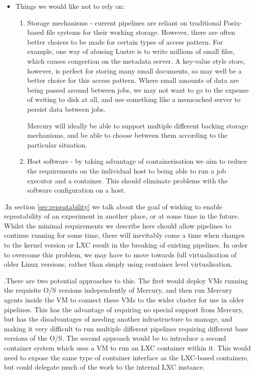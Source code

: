 \documentclass[10pt,a4paper]{article}
\newcounter{paracounter}
\newcommand{\npar}{\par\noindent\refstepcounter{paracounter}\theparacounter.\space}
\begin{document}
\begin{itemize}
\begin{enumerate}
\end{enumerate}
\item Things we would like not to rely on:
\begin{enumerate}
\item Storage mechanisms - current pipelines are reliant on traditional Posix-based file systems for their working storage. However, there are often better choices to be made for certain types of access pattern. For example, one way of abusing Lustre is to write millions of small files, which causes congestion on the metadata server. A key-value style store, however, is perfect for storing many small documents, so may well be a better choice for this access pattern. Where small amounts of data are being passed around between jobs, we may not want to go to the expense of writing to disk at all, and use something like a memcached server to persist data between jobs.

Mercury will ideally be able to support multiple different backing storage mechanisms, and be able to choose between them according to the particular situation.
\item Host software - by taking advantage of containerisation we aim to reduce the requirements on the individual host to being able to run a job executor and a container. This should eliminate problems with the software configuration on a host.
\end{enumerate}
\end{itemize}
\npar In section \ref{sec:repeatability} we talk about the goal of wishing to enable repeatability of an experiment in another place, or at some time in the future. Whilst the minimal requirements we describe here should allow pipelines to continue running for some time, there will inevitably come a time when changes to the kernel version or LXC result in the breaking of existing pipelines. In order to overcome this problem, we may have to move towards full virtualisation of older Linux versions, rather than simply using container level virtualisation.
\npar There are two potential approaches to this. The first would deploy VMs running the requisite O/S versions independently of Mercury, and then run Mercury agents inside the VM to connect these VMs to the wider cluster for use in older pipelines. This has the advantage of requiring no special support from Mercury, but has the disadvantages of needing another infrastructure to manage, and making it very difficult to run multiple different pipelines requiring different base versions of the O/S. The second approach would be to introduce a second container system which uses a VM to run an LXC container within it. This would need to expose the same type of container interface as the LXC-based containers, but could delegate much of the work to the internal LXC instance.
\end{document}
